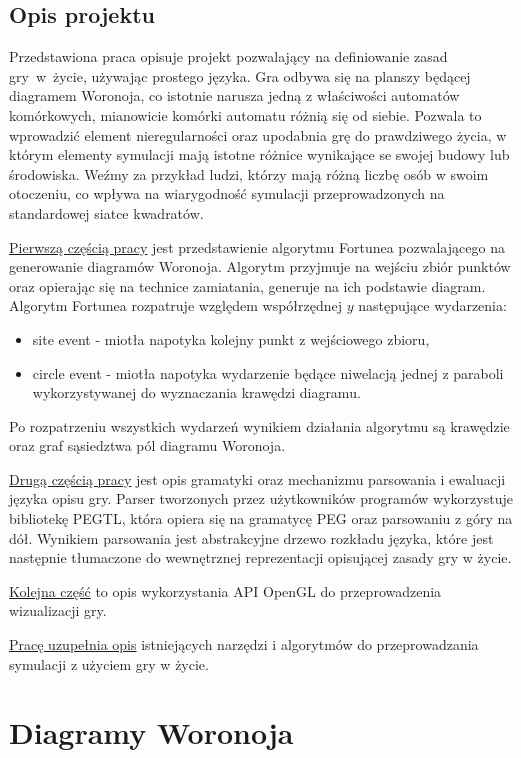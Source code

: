 \documentclass[declaration,shortabstract, inz]{iithesis}
\theoremstyle{definition} \newtheorem{definition}{Definicja}[]
\theoremstyle{plain} \newtheorem{remark}[definition]{Obserwacja}
\theoremstyle{plain} \newtheorem{theorem}[definition]{Twierdzenie}
\theoremstyle{plain} \newtheorem{example}{Przykład}[definition]
\theoremstyle{plain} \newtheorem{lemma}[definition]{Lemat}
\begin{document}
\section{Opis projektu}

Przedstawiona praca opisuje projekt pozwalający na definiowanie zasad gry~w~życie, używając prostego języka. Gra odbywa się na planszy będącej diagramem Woronoja, co istotnie narusza jedną z właściwości automatów komórkowych, mianowicie komórki automatu różnią się od siebie. Pozwala to wprowadzić element nieregularności oraz upodabnia grę do prawdziwego życia, w którym elementy symulacji mają istotne różnice wynikające se swojej budowy lub środowiska.
Weźmy za przykład ludzi, którzy mają różną liczbę osób w swoim otoczeniu, co wpływa na wiarygodność symulacji przeprowadzonych na standardowej siatce kwadratów.

\hyperref[sec:fortune]{Pierwszą częścią pracy} jest przedstawienie algorytmu Fortunea pozwalającego na generowanie diagramów Woronoja. Algorytm przyjmuje na wejściu zbiór punktów oraz opierając się na technice zamiatania, generuje na ich podstawie diagram.
Algorytm Fortunea rozpatruje względem współrzędnej $y$ następujące wydarzenia:
\begin{itemize}
	\item site event - miotła napotyka kolejny punkt z wejściowego zbioru,
	\item circle event - miotła napotyka wydarzenie będące niwelacją jednej z paraboli wykorzystywanej do wyznaczania krawędzi diagramu.
\end{itemize}
Po rozpatrzeniu wszystkich wydarzeń wynikiem działania algorytmu są krawędzie oraz graf sąsiedztwa pól diagramu Woronoja.

\hyperref[sec:parser]{Drugą częścią pracy} jest opis gramatyki oraz mechanizmu parsowania i ewaluacji języka opisu gry. Parser tworzonych przez użytkowników programów wykorzystuje bibliotekę PEGTL, która opiera się na gramatycę PEG oraz parsowaniu z góry na dół. Wynikiem parsowania jest abstrakcyjne drzewo rozkładu języka, które jest następnie tłumaczone do wewnętrznej reprezentacji opisującej zasady gry w życie.

\hyperref[sec:openGl]{Kolejna część} to opis wykorzystania API OpenGL do przeprowadzenia wizualizacji gry.

\hyperref[sec:tools]{Pracę uzupełnia opis} istniejących narzędzi i algorytmów do przeprowadzania symulacji z użyciem gry w życie.

\chapter{Diagramy Woronoja}
\end{document}

